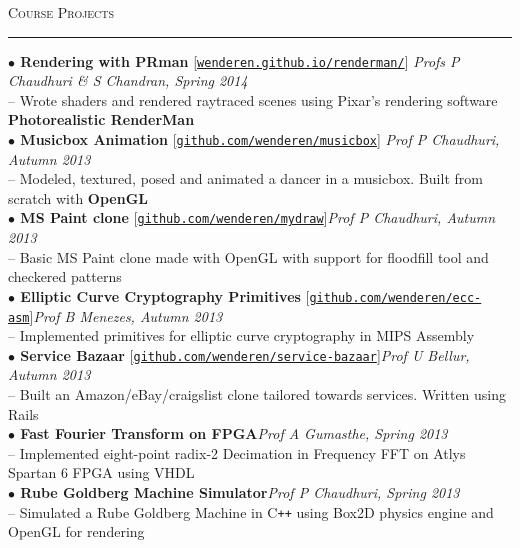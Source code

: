 \documentclass[a4paper,9pt]{article}
\begin{document}
\Large{\textsc{Course Projects}}\vspace{1.5pt}
\hrule\vspace{0.25cm}
\small
\textbf{$\bullet$ Rendering with PRman} [\href{https://wenderen.github.io/renderman/}{\texttt{wenderen.github.io/renderman/}}] \hfill \textit{Profs P Chaudhuri \& S Chandran, Spring 2014}\\
-- Wrote shaders and rendered raytraced scenes using Pixar's rendering software \textbf{Photorealistic RenderMan}\\
\textbf{$\bullet$ Musicbox Animation} [\href{https://github.com/wenderen/musicbox}{\texttt{github.com/wenderen/musicbox}}] \hfill \textit{Prof P Chaudhuri, Autumn 2013}\\
-- Modeled, textured, posed and animated a dancer in a musicbox. Built from scratch with \textbf{OpenGL}\\
\textbf{$\bullet$ MS Paint clone} [\href{https://github.com/wenderen/mydraw}{\texttt{github.com/wenderen/mydraw}}]\hfill \textit{Prof P Chaudhuri, Autumn 2013}\\
-- Basic MS Paint clone made with OpenGL with support for floodfill tool and checkered patterns\\
\textbf{$\bullet$ Elliptic Curve Cryptography Primitives} [\href{https://github.com/wenderen/ecc-asm}{\texttt{github.com/wenderen/ecc-asm}}]\hfill \textit{Prof B Menezes, Autumn 2013}\\
-- Implemented primitives for elliptic curve cryptography in MIPS Assembly\\
\textbf{$\bullet$ Service Bazaar} [\href{https://github.com/wenderen/service-bazaar}{\texttt{github.com/wenderen/service-bazaar}}]\hfill \textit{Prof U Bellur, Autumn 2013}\\
-- Built an Amazon/eBay/craigslist clone tailored towards services. Written using Rails\\
\textbf{$\bullet$ Fast Fourier Transform on FPGA}\hfill \textit{Prof A Gumasthe, Spring 2013}\\
-- Implemented eight-point radix-2 Decimation in Frequency FFT on Atlys Spartan 6 FPGA using VHDL\\
\textbf{$\bullet$ Rube Goldberg Machine Simulator}\hfill \textit{Prof P Chaudhuri, Spring 2013}\\
-- Simulated a Rube Goldberg Machine in C\verb!++! using Box2D physics engine and OpenGL for rendering\\
\end{document}
